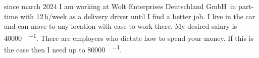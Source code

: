 \versionLanguageStart%
		since march 2024 I am working at \glqq Wolt Enterprises Deutschland GmbH\grqq\ in part-time with 12\,h/week as a delivery driver until I find a better job.
		I live in the car and can move to any location with ease to work there.
		My desired salary is \SI{40000}{\sieuro\per\year}.
		There are employers who dictate how to spend your money.
		If this is the case then I need up to \SI{80000}{\sieuro\per\year}.
\versionLanguageEnd